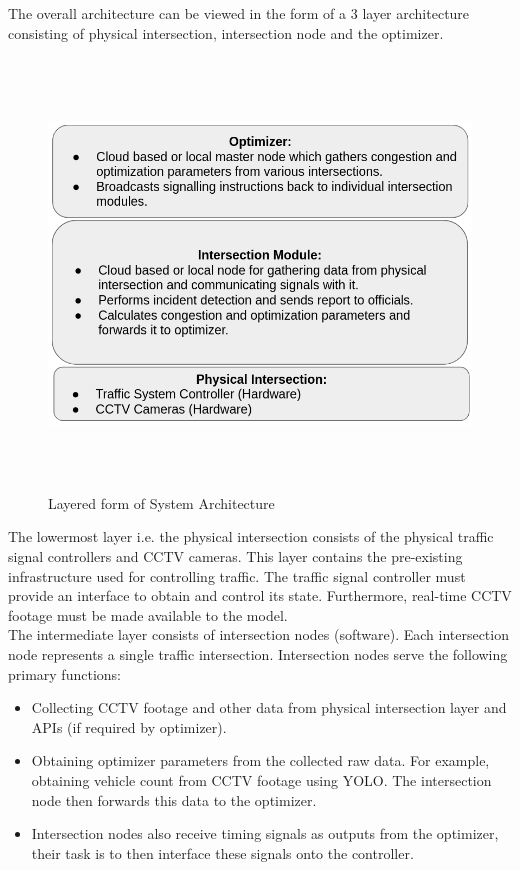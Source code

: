 \documentclass[openany,12pt]{report}
\begin{document}
	\hspace*{0.5in}The overall architecture can be viewed in the form of a  3 layer architecture consisting of physical intersection, intersection node and the optimizer.\\
	\begin{figure}[H]
		\centering
		\includegraphics[width=5.2in,height=4.5in]{./Diagrams/PNG/layered_architecture}
		\caption{Layered form of System Architecture}
	\end{figure}
	
	\hspace*{0.5in}The lowermost layer i.e. the physical intersection consists of the physical traffic signal controllers and CCTV cameras. This layer contains the pre-existing infrastructure used for controlling traffic. The traffic signal controller must provide an interface to obtain and control its state. Furthermore, real-time CCTV footage must be made available to the model.\\
	
	\hspace*{0.5in}The intermediate layer consists of intersection nodes (software). Each intersection node represents a single traffic intersection. Intersection nodes serve the following primary functions:\\
	
	\begin{itemize}
		\item{Collecting CCTV footage and other data from physical intersection layer and APIs (if required by optimizer).}
		\item{Obtaining optimizer parameters from the collected raw data. For example, obtaining vehicle count from CCTV footage using YOLO. The intersection node then forwards this data to the optimizer.}
		\item{Intersection nodes also receive timing signals as outputs from the optimizer, their task is to then interface these signals onto the controller.}
	\end{itemize}
	
\end{document}
